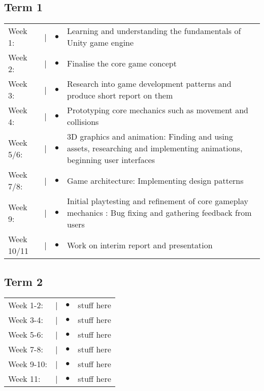 \documentclass[12pt]{article}
\begin{document}
\subsection{Term 1}
\begin{tabular}{@{}p{2cm}@{}>{\raggedright\arraybackslash}p{0.5cm}@{}>{\raggedright\arraybackslash}p{0.5cm}@{}p{12cm}}
Week 1: & \textcolor{black}{|} & $\bullet$ & Learning and understanding the fundamentals of Unity game engine \\
Week 2: & \textcolor{black}{|} & $\bullet$ & Finalise the core game concept \\
Week 3: & \textcolor{black}{|} & $\bullet$ & Research into game development patterns and produce short report on them \\
Week 4: & \textcolor{black}{|} & $\bullet$ & Prototyping core mechanics such as movement and collisions \\
Week 5/6: & \textcolor{black}{|} & $\bullet$ & 3D graphics and animation: Finding and using assets, researching and implementing animations, beginning user interfaces\\
Week 7/8: & \textcolor{black}{|} & $\bullet$ & Game architecture: Implementing design patterns \\
Week 9: & \textcolor{black}{|} & $\bullet$ & Initial playtesting and refinement of core gameplay mechanics : Bug fixing and gathering feedback from users\\
Week 10/11 & \textcolor{black}{|} & $\bullet$ & Work on interim report and presentation \\
\end{tabular}

\subsection{Term 2}
\begin{tabular}{@{}p{2cm}@{}>{\raggedright\arraybackslash}p{0.5cm}@{}>{\raggedright\arraybackslash}p{0.5cm}@{}p{12cm}}
Week 1-2: & \textcolor{black}{|} & $\bullet$ & stuff here \\
Week 3-4: & \textcolor{black}{|} & $\bullet$ & stuff here \\
Week 5-6: & \textcolor{black}{|} & $\bullet$ & stuff here \\
Week 7-8: & \textcolor{black}{|} & $\bullet$ & stuff here \\
Week 9-10: & \textcolor{black}{|} & $\bullet$ & stuff here \\
Week 11: & \textcolor{black}{|} & $\bullet$ & stuff here \\
\end{tabular}
\end{document}
